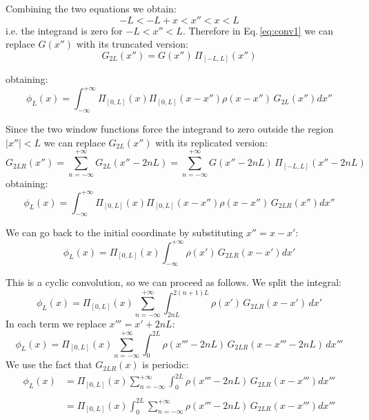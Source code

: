 Combining the two equations we obtain:
\begin{equation}
-L<-L + x < x'' <x<L
\end{equation}
i.e. the integrand is zero for $-L<x''<L$.
Therefore in Eq.\,\eqref{eq:conv1} we can replace $G(x'')$ with its truncated version:
\begin{equation}
G_{2L}(x'') = G(x'')\,\Pi_{[-L,L]}
\left(
{x''}
\right)
\end{equation}

obtaining:
\begin{equation}
\phi_L(x) = 
\int_{-\infty}^{+\infty} 
\Pi_{[0,L]}\left({x}\right)
\Pi_{[0,L]}\left({x-x''}\right)
\rho(x-x'')\,G_{2L}(x'') dx''
\label{eq:conv2}
\end{equation}

Since the two window functions force the integrand to zero outside the region $|x''|<L$ we can replace $G_{2L}(x'')$ with its replicated version:
\begin{equation}
G_{2LR}(x'') = \sum_{n=-\infty}^{+\infty}G_{2L}(x''-2nL) = \sum_{n=-\infty}^{+\infty}G(x'' -2nL)\,\Pi_{[-L,L]}
\left(
{x''-2nL}
\right)
\label{eq:GLR}
\end{equation}
obtaining:
\begin{equation}
\phi_L(x) = 
\int_{-\infty}^{+\infty} 
\Pi_{[0,L]}\left({x}\right)
\Pi_{[0,L]}\left({x-x''}\right)
\rho(x-x'')\,G_{2LR}(x'') dx''
\end{equation}

We can go back to the initial coordinate by substituting $x'' = x-x'$:
\begin{equation}
\phi_L(x) = 
\Pi_{[0,L]}\left(x\right)
\int_{-\infty}^{+\infty} 
\rho(x')\,G_{2LR}(x-x') dx'
\end{equation}

This is a cyclic convolution, so we can proceed as follows. We split the integral:
\begin{equation}
\phi_L(x) = 
\Pi_{[0,L]}\left({x}\right)
\sum_{n=-\infty}^{+\infty}
\int_{2nL}^{2(n+1)L} 
\rho(x')\,G_{2LR}(x-x') \,dx'
\label{eq:conv3}
\end{equation}
In each term we replace $x''' = x'+2nL$:
\begin{equation}
\phi_L(x) = 
\Pi_{[0,L]}\left({x}\right)
\sum_{n=-\infty}^{+\infty}
\int_{0 }^{2L} 
\rho(x'''-2nL)\,G_{2LR}(x-x'''-2nL) \,dx'''
\label{eq:conv4}
\end{equation}
We use the fact that $G_{2LR}(x)$ is periodic:
\begin{equation}
\begin{split}
\phi_L(x) &= 
\Pi_{[0,L]}\left({x}\right)
\sum_{n=-\infty}^{+\infty}
\int_{0 }^{2L} 
\rho(x'''-2nL)\,G_{2LR}(x-x''') dx'''\\
\\&=
\Pi_{[0,L]}\left({x}\right)
\int_{0 }^{2L}  
\sum_{n=-\infty}^{+\infty}
\rho(x'''-2nL)\,G_{2LR}(x-x''') dx'''
\end{split}
\label{eq:conv5}
\end{equation}

